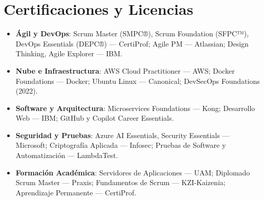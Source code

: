 \section*{Certificaciones y Licencias}

\begin{itemize}[leftmargin=12pt]
    \item \textbf{Ágil y DevOps}: Scrum Master (SMPC®), Scrum Foundation (SFPC™), DevOps Essentials (DEPC®) — CertiProf; Agile PM — Atlassian; Design Thinking, Agile Explorer — IBM.
    \item \textbf{Nube e Infraestructura}: AWS Cloud Practitioner — AWS; Docker Foundations — Docker; Ubuntu Linux — Canonical; DevSecOps Foundations (2022).
    \item \textbf{Software y Arquitectura}: Microservices Foundations — Kong; Desarrollo Web — IBM; GitHub y Copilot Career Essentials.
    \item \textbf{Seguridad y Pruebas}: Azure AI Essentials, Security Essentials — Microsoft; Criptografía Aplicada — Infosec; Pruebas de Software y Automatización — LambdaTest.
    \item \textbf{Formación Académica}: Servidores de Aplicaciones — UAM; Diplomado Scrum Master — Praxis; Fundamentos de Scrum — KZI-Kaizenia; Aprendizaje Permanente — CertiProf.
\end{itemize}
